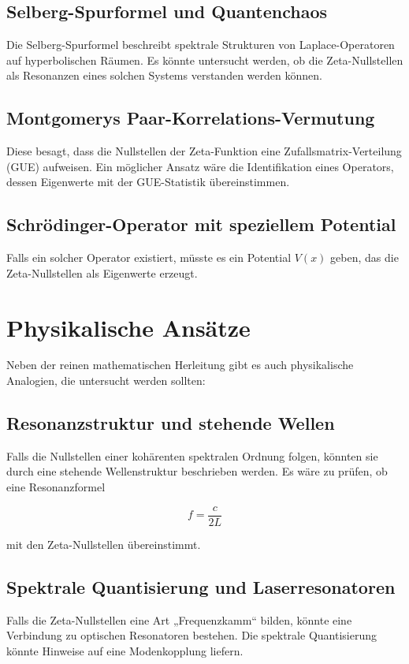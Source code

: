 \documentclass[a4paper,12pt]{article}
\begin{document}
\subsection{Selberg-Spurformel und Quantenchaos}
Die Selberg-Spurformel beschreibt spektrale Strukturen von Laplace-Operatoren auf hyperbolischen Räumen. Es könnte untersucht werden, ob die Zeta-Nullstellen als Resonanzen eines solchen Systems verstanden werden können.

\subsection{Montgomerys Paar-Korrelations-Vermutung}
Diese besagt, dass die Nullstellen der Zeta-Funktion eine Zufallsmatrix-Verteilung (GUE) aufweisen. Ein möglicher Ansatz wäre die Identifikation eines Operators, dessen Eigenwerte mit der GUE-Statistik übereinstimmen.

\subsection{Schrödinger-Operator mit speziellem Potential}
Falls ein solcher Operator existiert, müsste es ein Potential \(V(x)\) geben, das die Zeta-Nullstellen als Eigenwerte erzeugt.

\section{Physikalische Ansätze}
Neben der reinen mathematischen Herleitung gibt es auch physikalische Analogien, die untersucht werden sollten:

\subsection{Resonanzstruktur und stehende Wellen}
Falls die Nullstellen einer kohärenten spektralen Ordnung folgen, könnten sie durch eine stehende Wellenstruktur beschrieben werden. Es wäre zu prüfen, ob eine Resonanzformel

\begin{equation}
f = \frac{c}{2L}
\end{equation}

mit den Zeta-Nullstellen übereinstimmt.

\subsection{Spektrale Quantisierung und Laserresonatoren}
Falls die Zeta-Nullstellen eine Art „Frequenzkamm“ bilden, könnte eine Verbindung zu optischen Resonatoren bestehen. Die spektrale Quantisierung könnte Hinweise auf eine Modenkopplung liefern.
\end{document}
